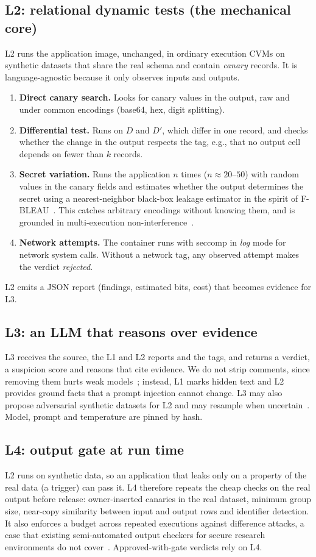 \subsection{L2: relational dynamic tests (the mechanical core)}\label{sec:judge-l2}
L2 runs the application image, unchanged, in ordinary execution CVMs on synthetic datasets that
share the real schema and contain \emph{canary} records. It is language-agnostic because it only
observes inputs and outputs.
\begin{enumerate}
  \item \textbf{Direct canary search.} Looks for canary values in the output, raw and under common
  encodings (base64, hex, digit splitting).
  \item \textbf{Differential test.} Runs on $D$ and $D'$, which differ in one record, and checks
  whether the change in the output respects the tag, e.g., that no output cell depends on fewer
  than $k$ records.
  \item \textbf{Secret variation.} Runs the application $n$ times ($n \approx 20$--$50$) with
  random values in the canary fields and estimates whether the output determines the secret
  using a nearest-neighbor black-box leakage estimator in the spirit of
  F-BLEAU~\cite{cherubin2019fbleau}. This catches arbitrary encodings without knowing them, and is
  grounded in multi-execution non-interference~\cite{rafnsson2016sme}.
  \item \textbf{Network attempts.} The container runs with seccomp in \emph{log} mode for network
  system calls. Without a network tag, any observed attempt makes the verdict \emph{rejected}.
\end{enumerate}
L2 emits a JSON report (findings, estimated bits, cost) that becomes evidence for L3.

\subsection{L3: an LLM that reasons over evidence}
L3 receives the source, the L1 and L2 reports and the tags, and returns a verdict, a suspicion
score and reasons that cite evidence. We do not strip comments, since removing them hurts weak
models~\cite{thornton2026fool}; instead, L1 marks hidden text and L2 provides ground facts that a
prompt injection cannot change. L3 may also propose adversarial synthetic datasets for L2 and may
resample when uncertain~\cite{bhatt2025ctrlz}. Model, prompt and temperature are pinned by hash.

\subsection{L4: output gate at run time}\label{sec:judge-l4}
L2 runs on synthetic data, so an application that leaks only on a property of the real data
(a trigger) can pass it. L4 therefore repeats the cheap checks on the real output before release:
owner-inserted canaries in the real dataset, minimum group size, near-copy similarity between
input and output rows and identifier detection. It also enforces a budget across repeated
executions against difference attacks, a case that existing semi-automated output checkers for
secure research environments do not cover~\cite{green2022acro}. Approved-with-gate verdicts
rely on L4.
